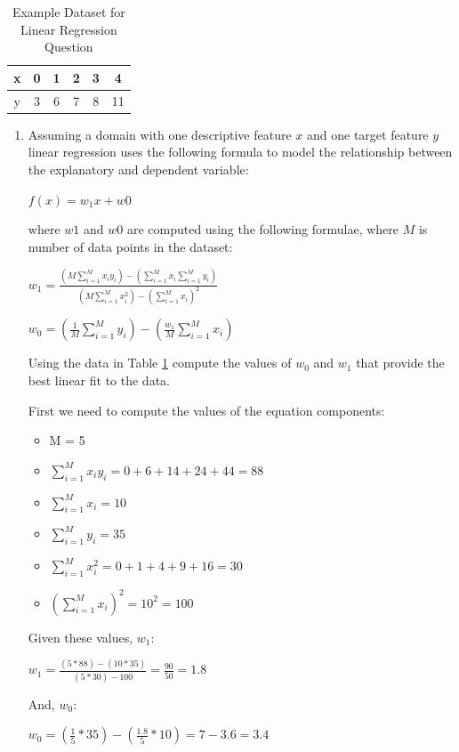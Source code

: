 \documentclass[--SOLUTION-OPTION--]{ditpaper}
\begin{document}

\begin{table}
\begin{center}
\begin{tabular}{cccccc}
\hline
x & 0 & 1 & 2 & 3 & 4\\
\hline
y & 3 & 6 & 7 & 8 & 11\\
\hline
\end{tabular}
\caption{Example Dataset for Linear Regression Question}
\label{tab:linregTab2}
\end{center}
\end{table}

\question 
	\begin{enumerate}
		\item Assuming a domain with one descriptive feature $x$ and one target feature $y$ linear regression uses the following formula to model the relationship between the explanatory and dependent variable: 
	\begin{center}
		$f(x) = w_1x + w0$
	\end{center}
where $w1$ and $w0$ are computed using the following formulae, where $M$ is number of data points in the dataset:
	\begin{center}
		$w_1 =  \frac{(M \sum_{i=1}^M x_i y_i) - (\sum_{i=1}^{M} x_i \sum_{i=1}^{M} y_i)} {(M \sum_{i=1}^{M} x_i^2) - (\sum_{i=1}^{M} x_i)^2}$
	\end{center}
	\begin{center}
		$w_0 = (\frac{1}{M} \sum_{i=1}^{M} y_i) - (\frac{w_1}{M} \sum_{i=1}^{M} x_i)$
	\end{center}
Using the data in Table \ref{tab:linregTab2} compute the values of $w_0$ and $w_1$ that provide the best linear fit to the data.
			\begin{answer}
				First we need to compute the values of the equation components:
			\begin{itemize}
				\item M = 5
				\item $\sum_{i=1}^{M} x_i y_i = 0 + 6 + 14 + 24 + 44 = 88$
				\item $\sum_{i=1}^{M} x_i = 10$
			   	\item $\sum_{i=1}^{M} y_i = 35$
			  	\item $\sum_{i=1}^{M} x_i^2 = 0 + 1 + 4 + 9 + 16 = 30$
			  	\item $(\sum_{i=1}^{M} x_i)^2 = 10^2 = 100$
			\end{itemize}
				Given these values,  $w_1$:
				\begin{center}
					\textbf{$w_1= \frac{(5*88)-(10*35)}{(5*30)-100} = \frac{90}{50}=1.8$}
				\end{center}
				And, $w_0$:
				\begin{center}
				\textbf{$w_0= (\frac{1}{5}*35) - (\frac{1.8}{5}*10)= 7-3.6=3.4$}
			\end{center}
			\end{answer}
		

\end{enumerate}
\end{document}
